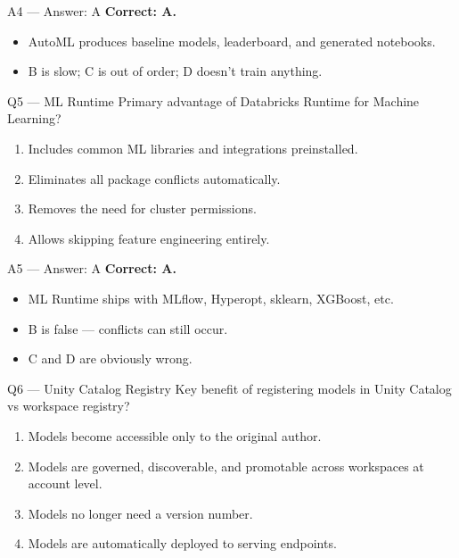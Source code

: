 \documentclass[aspectratio=169,10pt]{beamer}
\begin{document}
	\begin{frame}{A4 — Answer: A}
		\textbf{Correct: A.}
		\begin{itemize}
			\item AutoML produces baseline models, leaderboard, and generated notebooks.
			\item B is slow; C is out of order; D doesn't train anything.
		\end{itemize}
	\end{frame}
	
	\begin{frame}{Q5 — ML Runtime}
		Primary advantage of Databricks Runtime for Machine Learning?
		\begin{enumerate}[label=\Alph*.]
			\item Includes common ML libraries and integrations preinstalled.
			\item Eliminates all package conflicts automatically.
			\item Removes the need for cluster permissions.
			\item Allows skipping feature engineering entirely.
		\end{enumerate}
	\end{frame}
	
	\begin{frame}{A5 — Answer: A}
		\textbf{Correct: A.}
		\begin{itemize}
			\item ML Runtime ships with MLflow, Hyperopt, sklearn, XGBoost, etc.
			\item B is false — conflicts can still occur.
			\item C and D are obviously wrong.
		\end{itemize}
	\end{frame}
	
	\begin{frame}{Q6 — Unity Catalog Registry}
		Key benefit of registering models in Unity Catalog vs workspace registry?
		\begin{enumerate}[label=\Alph*.]
			\item Models become accessible only to the original author.
			\item Models are governed, discoverable, and promotable across workspaces at account level.
			\item Models no longer need a version number.
			\item Models are automatically deployed to serving endpoints.
		\end{enumerate}
	\end{frame}
	
\end{document}
